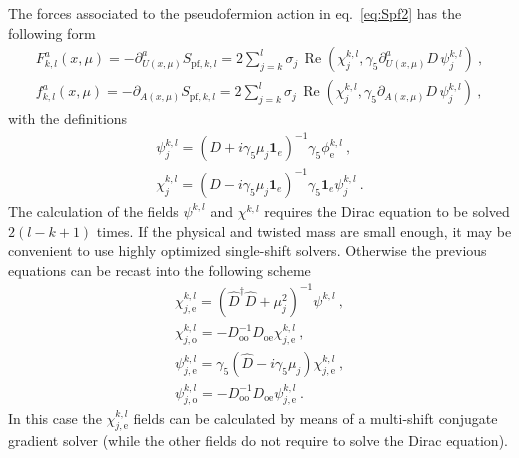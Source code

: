 \documentclass[11pt,fleqn]{article}
\renewcommand{\Re}[0]{\operatorname{Re}}
\begin{document}
The forces associated to the pseudofermion action in eq.~\eqref{eq:Spf2} has the following form
\begin{gather}
   F_{k,l}^a(x,\mu)
   =
   - \partial_{U(x,\mu)}^a S_{\text{pf},k,l}
   =
   2 \sum_{j=k}^l \sigma_j \, \Re ( \chi^{k,l}_j , \gamma_5 \partial_{U(x,\mu)}^a D \, \psi^{k,l}_j )
   \ , \\
   f_{k,l}^a(x,\mu)
   =
   - \partial_{A(x,\mu)} S_{\text{pf},k,l}
   =
   2 \sum_{j=k}^l \sigma_j \, \Re ( \chi^{k,l}_j , \gamma_5 \partial_{A(x,\mu)} D \, \psi^{k,l}_j )
   \ ,
\end{gather}
with the definitions
\begin{gather}
   \psi^{k,l}_j = (D + i \gamma_5 \mu_j \mathbf{1}_e)^{-1} \gamma_5 \phi^{k,l}_\text{e} \ , \\
   \chi^{k,l}_j = (D - i \gamma_5 \mu_j \mathbf{1}_e)^{-1} \gamma_5 \mathbf{1}_e \psi^{k,l}_j \ .
\end{gather}
The calculation of the fields $\psi^{k,l}$ and $\chi^{k,l}$ requires the Dirac equation to be solved $2(l-k+1)$ times. If the physical and twisted mass are small enough, it may be convenient to use highly optimized single-shift solvers. Otherwise the previous equations can be recast into the following scheme
\begin{gather}
   \chi^{k,l}_{j,\text{e}} = ( \hat{D}^\dag \hat{D} + \mu_j^2 )^{-1} \psi^{k,l} \ , \\
   \chi^{k,l}_{j,\text{o}} = - D_\text{oo}^{-1} D_\text{oe} \chi^{k,l}_{j,\text{e}} \ , \\
   \psi^{k,l}_{j,\text{e}} = \gamma_5 (\hat{D} - i \gamma_5 \mu_j) \chi^{k,l}_{j,\text{e}} \ , \\
   \psi^{k,l}_{j,\text{o}} = - D_\text{oo}^{-1} D_\text{oe} \psi^{k,l}_{j,\text{e}} \ .
\end{gather}
In this case the $\chi^{k,l}_{j,\text{e}}$ fields can be calculated by means of a multi-shift conjugate gradient solver (while the other fields do not require to solve the Dirac equation).
\end{document}
